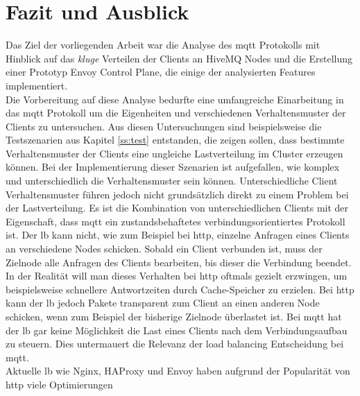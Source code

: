 \section{Fazit und Ausblick}
Das Ziel der vorliegenden Arbeit war die Analyse des \ac{mqtt} Protokolls mit Hinblick auf das \textit{kluge} Verteilen der Clients an HiveMQ Nodes und die Erstellung einer Prototyp Envoy Control Plane, die einige der analysierten Features implementiert.
\\
Die Vorbereitung auf diese Analyse bedurfte eine umfangreiche Einarbeitung in das \ac{mqtt} Protokoll um die Eigenheiten und verschiedenen Verhaltensmuster der Clients zu untersuchen. Aus diesen Untersuchungen sind beispielsweise die Testszenarien aus Kapitel \ref{ss:test} entstanden, die zeigen sollen, dass bestimmte Verhaltensmuster der Clients eine ungleiche Lastverteilung im Cluster erzeugen können. Bei der Implementierung dieser Szenarien ist aufgefallen, wie komplex und unterschiedlich die Verhaltensmuster sein können.
Unterschiedliche Client Verhaltensmuster führen jedoch nicht grundsätzlich direkt zu einem Problem bei der Lastverteilung. Es ist die Kombination von unterschiedlichen Clients mit der Eigenschaft, dass \ac{mqtt} ein zustandsbehaftetes verbindungsorientiertes Protokoll ist.
Der \acl{lb} kann nicht, wie zum Beispiel bei \ac{http}, einzelne Anfragen eines Clients an verschiedene Nodes schicken. Sobald ein Client verbunden ist, muss der Zielnode alle Anfragen des Clients bearbeiten, bis dieser die Verbindung beendet.
In der Realität will man dieses Verhalten bei \ac{http} oftmals gezielt erzwingen, um beispielsweise schnellere Antwortzeiten durch Cache-Speicher zu erzielen. Bei \ac{http} kann der \acl{lb} jedoch Pakete transparent zum Client an einen anderen Node schicken, wenn zum Beispiel der bisherige Zielnode überlastet ist. Bei \ac{mqtt} hat der \acl{lb} gar keine Möglichkeit die Last eines Clients nach dem Verbindungsaufbau zu steuern.
Dies untermauert die Relevanz der load balancing Entscheidung bei \ac{mqtt}.
\\
Aktuelle \acl{lb} wie Nginx, HAProxy und Envoy haben aufgrund der Popularität von \ac{http} viele Optimierungen 

\begin{comment}
- eigene meinung

- client transparentes roaming
- weighted cpu round robin ? worth it ?
- es gibt sehr viele verschiedene client szenarien -> hivemq swarm -> programmable lb

implementierung:
- sticky session
- mutex in der control plane
\end{comment}
